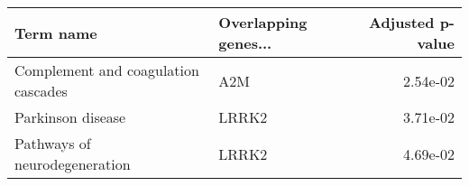 \begin{tabular}{llr}
\toprule
                          Term name & Overlapping genes... &  Adjusted p-value \\
\midrule
Complement and coagulation cascades &                  A2M &          2.54e-02 \\
                  Parkinson disease &                LRRK2 &          3.71e-02 \\
      Pathways of neurodegeneration &                LRRK2 &          4.69e-02 \\
\bottomrule
\end{tabular}
